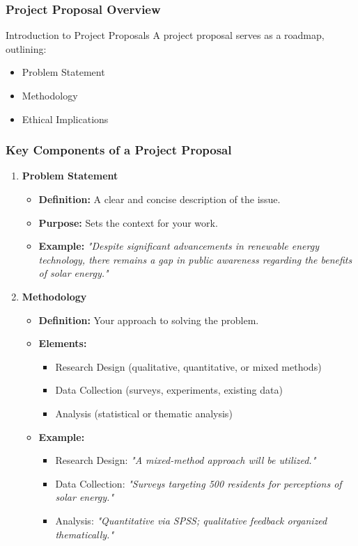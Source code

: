 \documentclass[aspectratio=169]{beamer}
\begin{document}
\begin{frame}[fragile]
    \frametitle{Project Proposal Overview}
    \begin{block}{Introduction to Project Proposals}
        A project proposal serves as a roadmap, outlining:
        \begin{itemize}
            \item Problem Statement
            \item Methodology
            \item Ethical Implications
        \end{itemize}
    \end{block}
\end{frame}

\begin{frame}[fragile]
    \frametitle{Key Components of a Project Proposal}
    \begin{enumerate}
        \item \textbf{Problem Statement}
        \begin{itemize}
            \item \textbf{Definition:} A clear and concise description of the issue.
            \item \textbf{Purpose:} Sets the context for your work.
            \item \textbf{Example:} \textit{"Despite significant advancements in renewable energy technology, there remains a gap in public awareness regarding the benefits of solar energy."}
        \end{itemize}
        
        \item \textbf{Methodology}
        \begin{itemize}
            \item \textbf{Definition:} Your approach to solving the problem.
            \item \textbf{Elements:}
            \begin{itemize}
                \item Research Design (qualitative, quantitative, or mixed methods)
                \item Data Collection (surveys, experiments, existing data)
                \item Analysis (statistical or thematic analysis)
            \end{itemize}
            \item \textbf{Example:}
            \begin{itemize}
                \item Research Design: \textit{"A mixed-method approach will be utilized."}
                \item Data Collection: \textit{"Surveys targeting 500 residents for perceptions of solar energy."}
                \item Analysis: \textit{"Quantitative via SPSS; qualitative feedback organized thematically."}
            \end{itemize}
        \end{itemize}
    \end{enumerate}
\end{frame}
\end{document}
